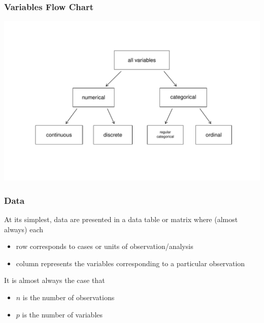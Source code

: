 \documentclass[handout]{beamer}
\newcommand{\blue}[1]{\textcolor{blue2}{#1}}
\begin{document}
\begin{frame}[fragile]
\frametitle{Variables Flow Chart}

\begin{center}
\includegraphics[width=\linewidth]{figure/flow-chart} 
\end{center}

\end{frame}



\begin{frame}
\frametitle{Data}

At its simplest, data are presented in a data table or matrix where (almost always) each
\begin{itemize}
\pause\item row corresponds to \blue{cases} or \blue{units of observation/analysis}
\pause\item column represents the variables corresponding to a particular observation
\end{itemize}

\pause It is almost always the case that 

\begin{itemize}
  \pause\item $n$ is the number of observations
  \pause\item $p$ is the number of variables
\end{itemize}

\end{frame}
\end{document}
